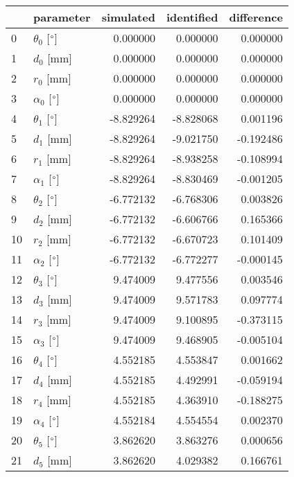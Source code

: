 \documentclass{standalone}%
\begin{document}
%
\normalsize%
\begin{tabular}{llrrr}
\toprule
{} &                 parameter & simulated & identified & difference \\
\midrule
0  &  $\theta_{0}$ [$\degree$] &  0.000000 &   0.000000 &   0.000000 \\
1  &              $d_{0}$ [mm] &  0.000000 &   0.000000 &   0.000000 \\
2  &              $r_{0}$ [mm] &  0.000000 &   0.000000 &   0.000000 \\
3  &  $\alpha_{0}$ [$\degree$] &  0.000000 &   0.000000 &   0.000000 \\
4  &  $\theta_{1}$ [$\degree$] & -8.829264 &  -8.828068 &   0.001196 \\
5  &              $d_{1}$ [mm] & -8.829264 &  -9.021750 &  -0.192486 \\
6  &              $r_{1}$ [mm] & -8.829264 &  -8.938258 &  -0.108994 \\
7  &  $\alpha_{1}$ [$\degree$] & -8.829264 &  -8.830469 &  -0.001205 \\
8  &  $\theta_{2}$ [$\degree$] & -6.772132 &  -6.768306 &   0.003826 \\
9  &              $d_{2}$ [mm] & -6.772132 &  -6.606766 &   0.165366 \\
10 &              $r_{2}$ [mm] & -6.772132 &  -6.670723 &   0.101409 \\
11 &  $\alpha_{2}$ [$\degree$] & -6.772132 &  -6.772277 &  -0.000145 \\
12 &  $\theta_{3}$ [$\degree$] &  9.474009 &   9.477556 &   0.003546 \\
13 &              $d_{3}$ [mm] &  9.474009 &   9.571783 &   0.097774 \\
14 &              $r_{3}$ [mm] &  9.474009 &   9.100895 &  -0.373115 \\
15 &  $\alpha_{3}$ [$\degree$] &  9.474009 &   9.468905 &  -0.005104 \\
16 &  $\theta_{4}$ [$\degree$] &  4.552185 &   4.553847 &   0.001662 \\
17 &              $d_{4}$ [mm] &  4.552185 &   4.492991 &  -0.059194 \\
18 &              $r_{4}$ [mm] &  4.552185 &   4.363910 &  -0.188275 \\
19 &  $\alpha_{4}$ [$\degree$] &  4.552184 &   4.554554 &   0.002370 \\
20 &  $\theta_{5}$ [$\degree$] &  3.862620 &   3.863276 &   0.000656 \\
21 &              $d_{5}$ [mm] &  3.862620 &   4.029382 &   0.166761 \\

\end{tabular}
\end{document}
